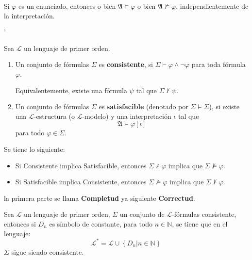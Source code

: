 \documentclass[12pt]{report}
\newcounter{it}
\theoremstyle{largebreak}
\begin{document}
    \begin{obs}
        Si $\varphi$ es un enunciado, entonces o bien $\mathfrak{A}\vDash\varphi$ o bien $\mathfrak{A}\nvDash\varphi$, independientemente de la interpretación.
    \end{obs}

    '\begin{mydef}
        Sea $\mathcal{L}$ un lenguaje de primer orden.
        \begin{enumerate}
            \item Un conjunto de fórmulas $\Sigma$ es \textbf{consistente}, si $\Sigma\vdash\varphi\land\neg\varphi$ para toda fórmula $\varphi$.

            Equivalentemente, existe una fórmula $\psi$ tal que $\Sigma\nvdash\psi$.
            \item Un conjunto de fórmulas $\Sigma$ es \textbf{satisfacible} (denotado por $\Sigma\vDash\Sigma$), si existe una $\mathcal{L}$-estructura (o $\mathcal{L}$-modelo) y una interpretación $\iota$ tal que
            \begin{equation*}
                \mathfrak{A}\vDash\varphi[\iota]
            \end{equation*}
            para todo $\varphi\in\Sigma$.
        \end{enumerate}
    \end{mydef}

    \begin{obs}
        Se tiene lo siguiente:
        \begin{itemize}
            \item Si Consistente implica Satisfacible, entonces $\Sigma\nvdash\varphi$ implica que $\Sigma\nvDash\varphi$.
            \item Si Satisfacible implica Consistente, entonces $\Sigma\nvDash\varphi$ implica que $\Sigma\nvdash\varphi$.
        \end{itemize}
        la primera parte se llama \textbf{Completud} ya siguiente \textbf{Correctud}.
    \end{obs}

    \begin{lema}[Nombre]
        Sea $\mathcal{L}$ un lenguaje de primer orden, $\Sigma$ un conjunto de $\mathcal{L}$-fórmulas consistente, entonces si $D_n$ es símbolo de constante, para todo $n\in\mathbb{N}$, se tiene que en el lenguaje:
        \begin{equation*}
            \mathcal{L}^*=\mathcal{L}\cup\left\{D_n\Big|n\in\mathbb{N} \right\}
        \end{equation*}
        $\Sigma$ sigue siendo consistente.
    \end{lema}
\end{document}
